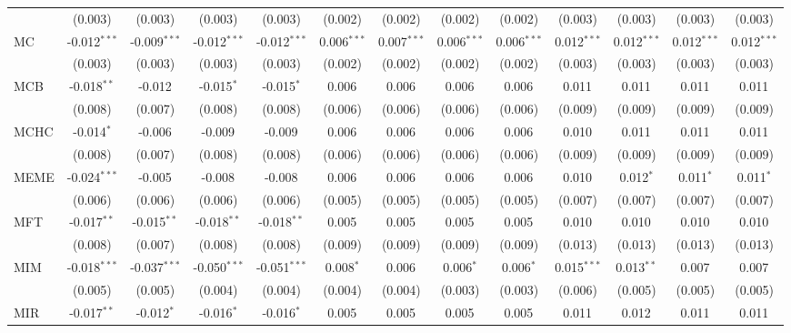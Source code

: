 \begin{table}[!htbp]
\begin{tabular}{@{\extracolsep{5pt}}lcccccccccccc}
  & (0.003) & (0.003) & (0.003) & (0.003) & (0.002) & (0.002) & (0.002) & (0.002) & (0.003) & (0.003) & (0.003) & (0.003) \\
 MC & -0.012$^{***}$ & -0.009$^{***}$ & -0.012$^{***}$ & -0.012$^{***}$ & 0.006$^{***}$ & 0.007$^{***}$ & 0.006$^{***}$ & 0.006$^{***}$ & 0.012$^{***}$ & 0.012$^{***}$ & 0.012$^{***}$ & 0.012$^{***}$ \\
  & (0.003) & (0.003) & (0.003) & (0.003) & (0.002) & (0.002) & (0.002) & (0.002) & (0.003) & (0.003) & (0.003) & (0.003) \\
 MCB & -0.018$^{**}$ & -0.012$^{}$ & -0.015$^{*}$ & -0.015$^{*}$ & 0.006$^{}$ & 0.006$^{}$ & 0.006$^{}$ & 0.006$^{}$ & 0.011$^{}$ & 0.011$^{}$ & 0.011$^{}$ & 0.011$^{}$ \\
  & (0.008) & (0.007) & (0.008) & (0.008) & (0.006) & (0.006) & (0.006) & (0.006) & (0.009) & (0.009) & (0.009) & (0.009) \\
 MCHC & -0.014$^{*}$ & -0.006$^{}$ & -0.009$^{}$ & -0.009$^{}$ & 0.006$^{}$ & 0.006$^{}$ & 0.006$^{}$ & 0.006$^{}$ & 0.010$^{}$ & 0.011$^{}$ & 0.011$^{}$ & 0.011$^{}$ \\
  & (0.008) & (0.007) & (0.008) & (0.008) & (0.006) & (0.006) & (0.006) & (0.006) & (0.009) & (0.009) & (0.009) & (0.009) \\
 MEME & -0.024$^{***}$ & -0.005$^{}$ & -0.008$^{}$ & -0.008$^{}$ & 0.006$^{}$ & 0.006$^{}$ & 0.006$^{}$ & 0.006$^{}$ & 0.010$^{}$ & 0.012$^{*}$ & 0.011$^{*}$ & 0.011$^{*}$ \\
  & (0.006) & (0.006) & (0.006) & (0.006) & (0.005) & (0.005) & (0.005) & (0.005) & (0.007) & (0.007) & (0.007) & (0.007) \\
 MFT & -0.017$^{**}$ & -0.015$^{**}$ & -0.018$^{**}$ & -0.018$^{**}$ & 0.005$^{}$ & 0.005$^{}$ & 0.005$^{}$ & 0.005$^{}$ & 0.010$^{}$ & 0.010$^{}$ & 0.010$^{}$ & 0.010$^{}$ \\
  & (0.008) & (0.007) & (0.008) & (0.008) & (0.009) & (0.009) & (0.009) & (0.009) & (0.013) & (0.013) & (0.013) & (0.013) \\
 MIM & -0.018$^{***}$ & -0.037$^{***}$ & -0.050$^{***}$ & -0.051$^{***}$ & 0.008$^{*}$ & 0.006$^{}$ & 0.006$^{*}$ & 0.006$^{*}$ & 0.015$^{***}$ & 0.013$^{**}$ & 0.007$^{}$ & 0.007$^{}$ \\
  & (0.005) & (0.005) & (0.004) & (0.004) & (0.004) & (0.004) & (0.003) & (0.003) & (0.006) & (0.005) & (0.005) & (0.005) \\
 MIR & -0.017$^{**}$ & -0.012$^{*}$ & -0.016$^{*}$ & -0.016$^{*}$ & 0.005$^{}$ & 0.005$^{}$ & 0.005$^{}$ & 0.005$^{}$ & 0.011$^{}$ & 0.012$^{}$ & 0.011$^{}$ & 0.011$^{}$ \\

\end{tabular}
\end{table}

